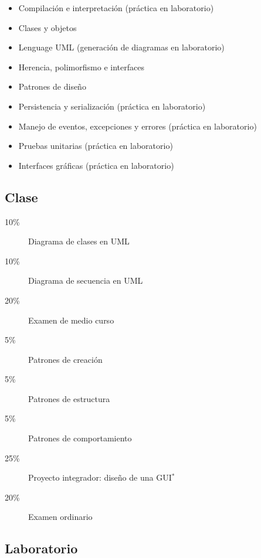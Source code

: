 \documentclass{article}
\begin{document}
\begin{multicols}{4}
\begin{itemize}
\item{Compilaci\'{o}n e interpretaci\'{o}n (pr\'{a}ctica en laboratorio)}
\item{Clases y objetos}
\item{Lenguage UML (generaci\'{o}n de diagramas en laboratorio)}
\item{Herencia, polimorfismo e interfaces}
\item{Patrones de dise\~{n}o}
\item{Persistencia y serializaci\'{o}n (pr\'{a}ctica en laboratorio)}
\item{Manejo de eventos, excepciones y errores (pr\'{a}ctica en
  laboratorio)}
\item{Pruebas unitarias (pr\'{a}ctica en laboratorio)}
\item{Interfaces gr\'{a}ficas (pr\'{a}ctica en laboratorio)}
\end{itemize}

\subsection*{Clase}

\begin{description}
\item[10\%]{Diagrama de clases en UML}
\item[10\%]{Diagrama de secuencia en UML}
\item[20\%]{Examen de medio curso}
\item[5\%]{Patrones de creaci\'{o}n}
\item[5\%]{Patrones de estructura}
\item[5\%]{Patrones de comportamiento}
\item[25\%]{Proyecto integrador: dise\~{n}o de una GUI$^\ast$}      
\item[20\%]{Examen ordinario}
\end{description}

\subsection*{Laboratorio}


\end{multicols}
\end{document}
